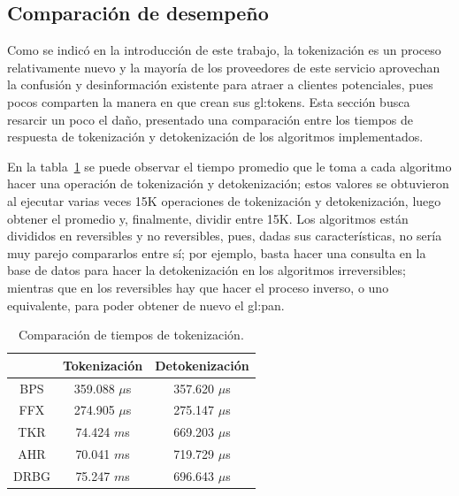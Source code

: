 %
%
%

\subsection{Comparación de desempeño}
\label{sec:comparacion}

Como se indicó en la introducción de este trabajo, la tokenización es un
proceso relativamente nuevo y la mayoría de los proveedores de este servicio
aprovechan la confusión y desinformación existente para atraer a clientes
potenciales, pues pocos comparten la manera en que crean sus \glspl{gl:token}.
Esta sección busca resarcir un poco el daño, presentado una comparación entre
los tiempos de respuesta de tokenización y detokenización de los algoritmos
implementados.

En la tabla~\ref{tabla:tiempos_tokenizacion} se puede observar el tiempo
promedio que le toma a cada algoritmo hacer una operación de tokenización
y detokenización; estos valores se obtuvieron al ejecutar varias veces 15K
operaciones de tokenización y detokenización, luego obtener el promedio
y, finalmente, dividir entre 15K. Los algoritmos están divididos en reversibles
y no reversibles, pues, dadas sus características, no sería muy parejo
compararlos entre sí; por ejemplo, basta hacer una consulta en la base de datos
para hacer la detokenización en los algoritmos irreversibles; mientras que en
los reversibles hay que hacer el proceso inverso, o uno equivalente, para
poder obtener de nuevo el \gls{gl:pan}.

\begin{table}
  \begin{center}
    \begin{tabular}{c|c|c|}
      \cline{2-3}
      & Tokenización & Detokenización \\
      \hline
      \multicolumn{1}{|c|}{BPS}
        & 359.088   $\mu$s & 357.620 $\mu$s   \\\hline
      \multicolumn{1}{|c|}{FFX}
        & 274.905   $\mu$s & 275.147 $\mu$s   \\\hline

      \multicolumn{1}{|c|}{TKR}
        & 74.424  $m$s & 669.203 $\mu$s   \\\hline
      \multicolumn{1}{|c|}{AHR}
        & 70.041  $m$s & 719.729 $\mu$s   \\\hline
      \multicolumn{1}{|c|}{DRBG}
        & 75.247  $m$s & 696.643 $\mu$s  \\\hline
    \end{tabular}

    \caption{Comparación de tiempos de tokenización.}
    \label{tabla:tiempos_tokenizacion}
  \end{center}
\end{table}

